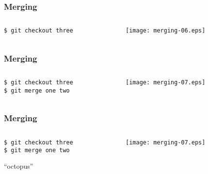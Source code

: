 \documentclass[english]{beamer}
\newcommand{\CMD}[1]{%
\texttt{\textcolor{code-green}{#1}}%
}
\newcommand{\cmd}[1]{%
\texttt{\textcolor{code-orange}{#1}}%
}
\begin{document}
\begin{frame}
\frametitle{Merging}

\begin{columns}[t]
        \begin{column}[T]{.5\textwidth}
                {\small
                \CMD{\$ git checkout three} \\
                }
        \end{column}
        \begin{column}[T]{.5\textwidth}
                \texttt{[image: merging-06.eps]}
        \end{column}
\end{columns}
\end{frame}

\begin{frame}
\frametitle{Merging}

\begin{columns}[t]
        \begin{column}[T]{.5\textwidth}
                {\small
                \cmd{\$ git checkout three} \\
                \CMD{\$ git merge one two} \\
                }
        \end{column}
        \begin{column}[T]{.5\textwidth}
                \texttt{[image: merging-07.eps]}
        \end{column}
\end{columns}
\end{frame}

\begin{frame}
\frametitle{Merging}

\begin{columns}[t]
        \begin{column}[T]{.5\textwidth}
                {\small
                \cmd{\$ git checkout three} \\
                \CMD{\$ git merge one two} \\
                }
                \vspace{.2\textheight}
                \begin{center}
                        ``octopus''
                \end{center}
        \end{column}
        \begin{column}[T]{.5\textwidth}
                \texttt{[image: merging-07.eps]}
        \end{column}
\end{columns}
\end{frame}
\end{document}
